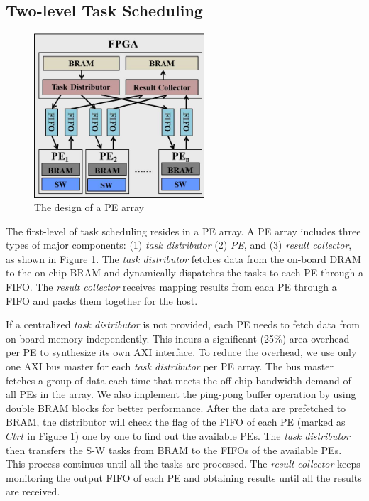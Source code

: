\subsection{Two-level Task Scheduling}
\begin{figure}[!hbt]
\begin{center}
\includegraphics[width=2.5in]{Figures/Figure_Arch2.jpg}
\caption {The design of a PE array} \label{fig:schedule_structure} \end{center} \end{figure}
The first-level of task scheduling resides in a PE array. 
A PE array includes three types of major components: (1) \textit{task distributor} (2) \textit{PE}, and (3) \textit{result collector}, 
as shown in Figure \ref{fig:schedule_structure}.
The \textit{task distributor} fetches data from the on-board DRAM to the on-chip BRAM and dynamically dispatches the tasks to each PE through a FIFO.
The \textit{result collector} receives mapping results from each PE through a FIFO and packs them together for the host.

If a centralized \textit{task distributor} is not provided, each PE needs to fetch data from on-board memory independently. 
This incurs a significant (25\%) area overhead per PE to synthesize its own AXI interface. 
To reduce the overhead, we use only one AXI bus master for each \textit{task distributor} per PE array. 
The bus master fetches a group of data each time that meets the off-chip bandwidth demand of all PEs in the array. 
We also implement the ping-pong buffer operation by using double BRAM blocks for better performance. 
After the data are prefetched to BRAM, 
the distributor will check the flag of the FIFO of each PE (marked as $Ctrl$ in Figure \ref{fig:schedule_structure}) one by one to find out the available PEs. 
The \textit{task distributor} then transfers the S-W tasks from BRAM to the FIFOs of the available PEs. 
This process continues until all the tasks are processed.
The \textit{result collector} keeps monitoring the output FIFO of each PE and obtaining results until all the results are received.

